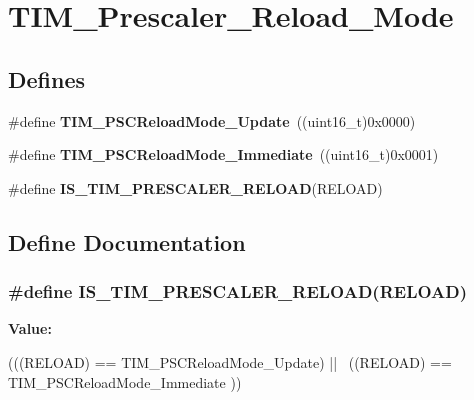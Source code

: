 \hypertarget{group__TIM__Prescaler__Reload__Mode}{
\section{TIM\_\-Prescaler\_\-Reload\_\-Mode}
\label{group__TIM__Prescaler__Reload__Mode}
}
\subsection*{Defines}
\begin{DoxyCompactItemize}
\item 
\hypertarget{group__TIM__Prescaler__Reload__Mode_gad76dd05a3ae4e44e040e0e083bd460bf}{
\#define {\bfseries TIM\_\-PSCReloadMode\_\-Update}~((uint16\_\-t)0x0000)}
\label{group__TIM__Prescaler__Reload__Mode_gad76dd05a3ae4e44e040e0e083bd460bf}

\item 
\hypertarget{group__TIM__Prescaler__Reload__Mode_ga9ba55481ccdcb64268b7b9f2095bfc17}{
\#define {\bfseries TIM\_\-PSCReloadMode\_\-Immediate}~((uint16\_\-t)0x0001)}
\label{group__TIM__Prescaler__Reload__Mode_ga9ba55481ccdcb64268b7b9f2095bfc17}

\item 
\#define {\bfseries IS\_\-TIM\_\-PRESCALER\_\-RELOAD}(RELOAD)
\end{DoxyCompactItemize}


\subsection{Define Documentation}
\hypertarget{group__TIM__Prescaler__Reload__Mode_ga156317fc6b2c1f6f2e1da9dfa555ecf4}{
\subsubsection[{IS\_\-TIM\_\-PRESCALER\_\-RELOAD}]{\setlength{\rightskip}{0pt plus 5cm}\#define IS\_\-TIM\_\-PRESCALER\_\-RELOAD(RELOAD)}}
\label{group__TIM__Prescaler__Reload__Mode_ga156317fc6b2c1f6f2e1da9dfa555ecf4}
{\bfseries Value:}
\begin{DoxyCode}
(((RELOAD) == TIM_PSCReloadMode_Update) || \
                                         ((RELOAD) == TIM_PSCReloadMode_Immediate
      ))
\end{DoxyCode}
